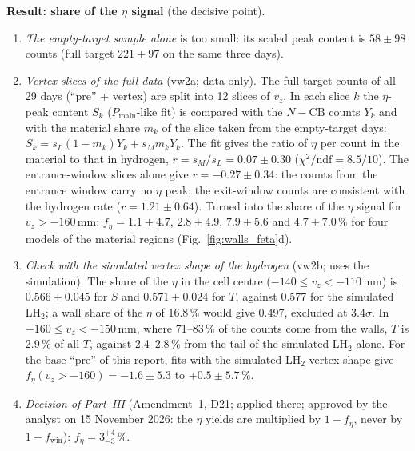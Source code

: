\documentclass[11pt,a4paper]{article}
\newcommand{\Pmain}{\ensuremath{P_{\mathrm{main}}}\xspace}
\newcommand{\vz}{\ensuremath{v_z}\xspace}
\newcommand{\fwin}{\ensuremath{f_{\mathrm{win}}}\xspace}
\begin{document}
\textbf{Result: share of the $\eta$ signal} (the decisive point).
\begin{enumerate}\setlength{\itemsep}{0pt}
\item \emph{The empty-target sample alone} is too small: its scaled peak content is $58\pm98$ counts (full target $221\pm97$ on the same three
      days).
\item \emph{Vertex slices of the full data} (vw2a; data only). The full-target counts of all 29 days (``pre'' + vertex) are split into 12 slices of
      \vz. In each slice $k$ the $\eta$-peak content $S_k$ (\Pmain-like fit) is compared with the $N-\mathrm{CB}$ counts $Y_k$ and with the
      material share $m_k$ of the slice taken from the empty-target days: $S_k=s_L(1-m_k)Y_k+s_Mm_kY_k$. The fit gives the ratio of $\eta$ per count
      in the material to that in hydrogen, $r=s_M/s_L=0.07\pm0.30$ ($\chi^2/\mathrm{ndf}=8.5/10$). The entrance-window slices alone give
      $r=-0.27\pm0.34$: the counts from the entrance window carry no $\eta$ peak; the exit-window counts are consistent with the hydrogen rate
      ($r=1.21\pm0.64$). Turned into the share of the $\eta$ signal for $\vz>-160$\,mm: $f_\eta=1.1\pm4.7$, $2.8\pm4.9$, $7.9\pm5.6$ and
      $4.7\pm7.0$\,\% for four models of the material regions (Fig.~\ref{fig:walls_feta}d).
\item \emph{Check with the simulated vertex shape of the hydrogen} (vw2b; uses the simulation). The share of the $\eta$ in the cell centre
      ($-140\le\vz<-110$\,mm) is $0.566\pm0.045$ for $S$ and $0.571\pm0.024$ for $T$, against 0.577 for the simulated LH$_2$; a wall share of
      the $\eta$ of 16.8\,\% would give 0.497, excluded at 3.4$\sigma$. In $-160\le\vz<-150$\,mm, where 71--83\,\% of the counts come from the
      walls, $T$ is 2.9\,\% of all $T$, against 2.4--2.8\,\% from the tail of the simulated LH$_2$ alone. For the base ``pre'' of this report,
      fits with the simulated LH$_2$ vertex shape give $f_\eta(\vz>-160)=-1.6\pm5.3$ to $+0.5\pm5.7$\,\%.
\item \emph{Decision of Part~III} (Amendment~1, D21; applied there; approved by the analyst on 15 November 2026: the $\eta$ yields are
      multiplied by $1-f_\eta$, never by $1-\fwin$): $f_\eta=3^{+4}_{-3}$\,\%.
\end{enumerate}
\end{document}
